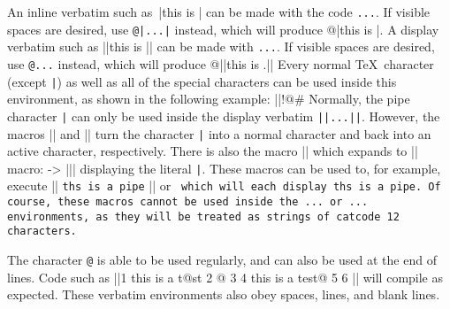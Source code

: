 An inline verbatim such as\ |this is \inline| can be made with the code {\tt\pipe...\pipe}. If visible spaces are desired, use 
{\tt @\string|...\string|} instead, which will produce @|this is \inline|. A display verbatim such as
||this is \display||
can be made with {\tt\pipe\pipe...\pipe\pipe}. If visible spaces are desired, use {\tt @\pipe\pipe...\pipe\pipe} instead, which will produce
@||this is \display.||
Every normal \TeX\ character (except {\tt\string|}) as well as all of the special characters can be used inside this environment, as shown in the following example:
||!$@$#%
Normally, the pipe character {\tt\string|} can only be used inside the display verbatim {\tt\string|\string|...\string|\string|}. However, the macros |\makepipeother| and |\makepipeactive| turn the character {\tt\string|} into a normal character and back into an active character, respectively. 
There is also the macro |\pipe| which expands to
|| macro: -> \bgroup\string|\egroup ||
displaying the literal {\tt\string|}. These macros can be used to, for example, execute
|| {\tt th\pipe{}s is a pipe} ||
or
\begindisplay
\tt
\makepipeother
\string\makepipeother{}\string\makepipeactive
\makepipeactive
\enddisplay
which will each display {\tt th\pipe{}s is a pipe}. Of course, these macros cannot be used inside the {\tt\pipe...\pipe} or {\tt\pipe\pipe...\pipe\pipe} environments, as they will be treated as strings of catcode 12 characters.

The character {\tt @} is able to be used regularly, and can also be used at the end of lines. Code such as
||1 this is a t@st
2 @
3
4 this is a test@
5
6 \bye||
will compile as expected. These verbatim environments also obey spaces, lines, and blank lines.

\bye
